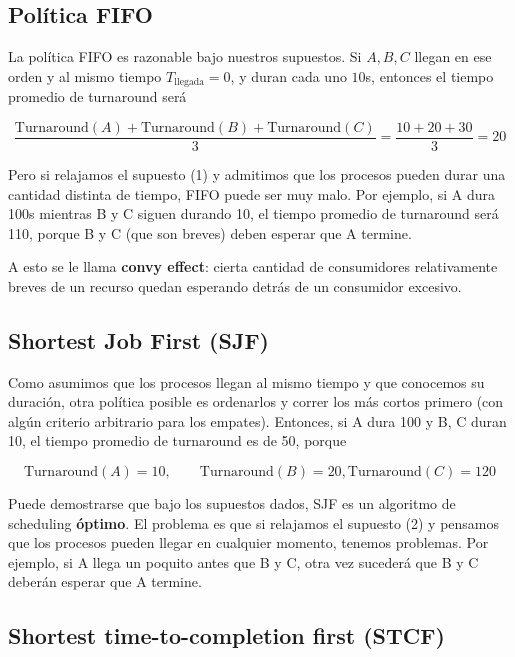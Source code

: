 \documentclass[12pt]{article}
\theoremstyle{definition}
\begin{document}
\subsection{Política FIFO}

La política FIFO es razonable bajo nuestros supuestos. Si $A, B, C$ llegan en
ese orden y al mismo tiempo $T_{\text{llegada}} = 0$, y duran cada uno $10$s, 
entonces el tiempo promedio de turnaround será 

\begin{equation*}
    \frac{\text{Turnaround}(A) + \text{Turnaround}(B) + \text{Turnaround}(C)
    }{3} = \frac{ 10 + 20 + 30 }{3} = 20
\end{equation*}

Pero si relajamos el supuesto (1) y admitimos que los procesos pueden durar una
cantidad distinta de tiempo, FIFO puede ser muy malo. Por ejemplo, si A dura
100s mientras B y C siguen durando 10, el tiempo promedio de turnaround será 
110, porque B y C (que son breves) deben esperar que A termine.

A esto se le llama \textbf{convy effect}: cierta cantidad de consumidores
relativamente breves de un recurso quedan esperando detrás de un consumidor
excesivo. 

\subsection{Shortest Job First (SJF)}

Como asumimos que los procesos llegan al mismo tiempo y que conocemos su
duración, otra política posible es ordenarlos y correr los más cortos primero
(con algún criterio arbitrario para los empates). Entonces, si A dura 100 y B, C
duran 10, el tiempo promedio de turnaround es de 50, porque 

\begin{equation*}
    \text{Turnaround}(A) = 10, \qquad \text{Turnaround}(B) = 20, \text{
    Turnaround}(C) = 120
\end{equation*}

Puede demostrarse que bajo los supuestos dados, SJF es un algoritmo de
scheduling \textbf{óptimo}. El problema es que si relajamos el supuesto (2) y
pensamos que los procesos pueden llegar en cualquier momento, tenemos
problemas. Por ejemplo, si A llega un poquito antes que B y C, otra vez
sucederá que B y C deberán esperar que A termine.

\subsection{Shortest time-to-completion first (STCF)}
\end{document}
